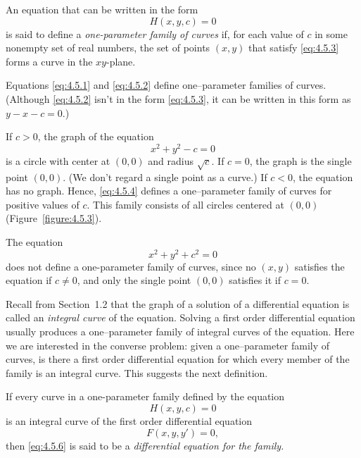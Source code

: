 \begin{definition}
  \color{blue}
  \label{thmtype:4.5.1} \rm An equation that can be written in the form
  \begin{equation}
    \label{eq:4.5.3}H(x,y,c)=0
  \end{equation}
  is said to define a {\color{blue}\it one-parameter family of curves\/} if, for each value of $c$
  in some nonempty set of real numbers, the set of points $(x,y)$ that satisfy \eqref{eq:4.5.3}
  forms a curve in the $xy$-plane.
\end{definition}

Equations \eqref{eq:4.5.1} and \eqref{eq:4.5.2} define one--parameter families of curves. (Although
\eqref{eq:4.5.2} isn't in the form \eqref{eq:4.5.3}, it can be written in this form as $y-x-c=0$.)

\begin{example}
  \label{example:4.5.3} \rm If $c>0$, the graph of the equation
  \begin{equation}
    \label{eq:4.5.4}x^{2}+y^{2}-c=0
  \end{equation}
  is a circle with center at $(0,0)$ and radius $\sqrt{c}$. If $c=0$, the graph is the single point
  $(0,0)$. (We don't regard a single point as a curve.) If $c<0$, the equation has no graph. Hence,
  \eqref{eq:4.5.4} defines a one--parameter family of curves for positive values of $c$. This family
  consists of all circles centered at $(0,0)$ (Figure~\ref{figure:4.5.3}).
\end{example}

\begin{example}
  \label{example:4.5.4} \rm The equation
  \[
    x^{2}+y^{2}+c^{2}=0
  \]
  does not define a one-parameter family of curves, since no $(x,y)$ satisfies the equation if
  $c\ne0$, and only the single point $(0,0)$ satisfies it if $c=0$. \bbox
\end{example}

Recall from Section~1.2 that the graph of a solution of a differential equation is called an
{\color{blue}\it integral curve\/} of the equation. Solving a first order differential equation
usually produces a one--parameter family of integral curves of the equation. Here we are interested
in the converse problem: given a one--parameter family of curves, is there a first order
differential equation for which every member of the family is an integral curve. This suggests the
next definition.

\begin{definition}
  \color{blue}
  \label{thmtype:4.5.2} \rm If every curve in a one-parameter family defined by the equation
  \begin{equation}
    \label{eq:4.5.5}H(x,y,c)=0
  \end{equation}
  is an integral curve of the first order differential equation
  \begin{equation}
    \label{eq:4.5.6}F(x,y,y')=0,
  \end{equation}
  then \eqref{eq:4.5.6} is said to be a {\color{blue}\it differential equation for the family.\/}
\end{definition}


